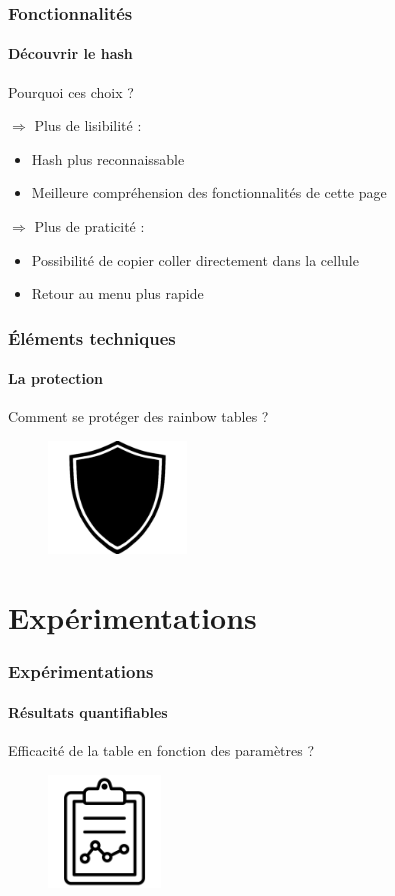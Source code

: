 \documentclass{beamer}
\begin{document}
\begin{frame}
\frametitle{Fonctionnalités}
\framesubtitle {Découvrir le hash}
\centering \huge Pourquoi ces choix ?
\begin{block}{}
\large
$\Rightarrow$ Plus de lisibilité : 
\begin{itemize}
    \item Hash plus reconnaissable
    \item Meilleure compréhension des fonctionnalités de cette page
\end{itemize}
$\Rightarrow$ Plus de praticité :
\begin{itemize}
    \item  Possibilité de copier coller directement dans la cellule
    \item  Retour au menu plus rapide
\end{itemize}
\end{block}{}
\end{frame}

\begin{frame}
\frametitle{Éléments techniques}
\framesubtitle {La protection}
\begin{center}
    \huge Comment se protéger des rainbow tables ?
\end{center}
\begin{figure}[H]
\centering
\includegraphics[height=3cm]{img/bouclier.png}
\end{figure}
\end{frame}

\section{Expérimentations}
\begin{frame}
\frametitle{Expérimentations}
\framesubtitle {Résultats quantifiables}
\begin{center}
    \huge Efficacité de la table en fonction des paramètres ?
\end{center}
\begin{figure}[H]
\centering
\includegraphics[height=3cm]{img/experimentation.png}
\end{figure}
\end{frame}
\end{document}
